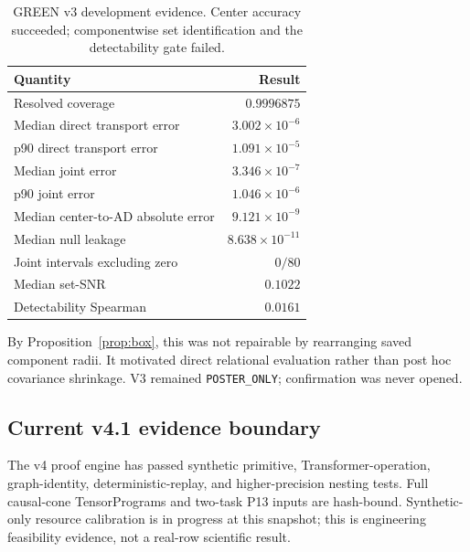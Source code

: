 \documentclass{article}
\begin{document}
\begin{table}[t]
\caption{GREEN v3 development evidence. Center accuracy succeeded; componentwise set identification and the detectability gate failed.}
\label{tab:v3}
\centering\small
\begin{tabular}{lr}
\toprule
\textbf{Quantity} & \textbf{Result} \\
\midrule
Resolved coverage & $0.9996875$ \\
Median direct transport error & $3.002\times10^{-6}$ \\
p90 direct transport error & $1.091\times10^{-5}$ \\
Median joint error & $3.346\times10^{-7}$ \\
p90 joint error & $1.046\times10^{-6}$ \\
Median center-to-AD absolute error & $9.121\times10^{-9}$ \\
Median null leakage & $8.638\times10^{-11}$ \\
Joint intervals excluding zero & $0/80$ \\
Median set-SNR & $0.1022$ \\
Detectability Spearman & $0.0161$ \\
\bottomrule
\end{tabular}
\end{table}
By Proposition~\ref{prop:box}, this was not repairable by rearranging saved component radii. It motivated direct relational evaluation rather than post hoc covariance shrinkage. V3 remained \texttt{POSTER\_ONLY}; confirmation was never opened.

\subsection{Current v4.1 evidence boundary}
The v4 proof engine has passed synthetic primitive, Transformer-operation, graph-identity, deterministic-replay, and higher-precision nesting tests. Full causal-cone TensorPrograms and two-task P13 inputs are hash-bound. Synthetic-only resource calibration is in progress at this snapshot; this is engineering feasibility evidence, not a real-row scientific result.

\begin{center}
\end{center}
\end{document}
